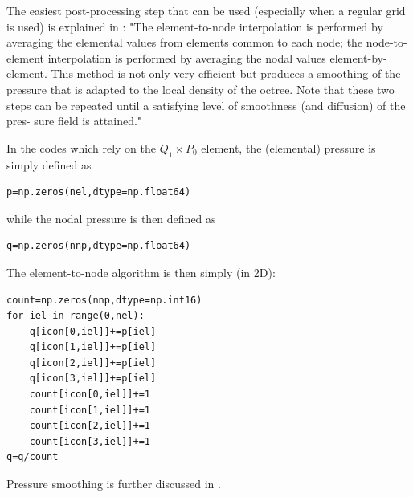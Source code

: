 The easiest post-processing step that can be used (especially when a regular grid is used) 
is explained in \cite{thfb08}: "The element-to-node interpolation is performed by
averaging the elemental values from elements common to each node; 
the node-to-element interpolation is performed
by averaging the nodal values element-by-element. This
method is not only very efficient but produces a smoothing
of the pressure that is adapted to the local density of the
octree. Note that these two steps can be repeated until a
satisfying level of smoothness (and diffusion) of the pres-
sure field is attained."

In the codes which rely on the $Q_1 \times P_0$ element, the (elemental) pressure
is simply defined as 
\begin{lstlisting}
p=np.zeros(nel,dtype=np.float64)  
\end{lstlisting}
while the nodal pressure is then defined as 
\begin{lstlisting}
q=np.zeros(nnp,dtype=np.float64)  
\end{lstlisting}
The element-to-node algorithm is then simply (in 2D):

\begin{lstlisting}
count=np.zeros(nnp,dtype=np.int16)  
for iel in range(0,nel):
    q[icon[0,iel]]+=p[iel]
    q[icon[1,iel]]+=p[iel]
    q[icon[2,iel]]+=p[iel]
    q[icon[3,iel]]+=p[iel]
    count[icon[0,iel]]+=1
    count[icon[1,iel]]+=1
    count[icon[2,iel]]+=1
    count[icon[3,iel]]+=1
q=q/count
\end{lstlisting}

Pressure smoothing is further discussed in \cite{hulb79}.









